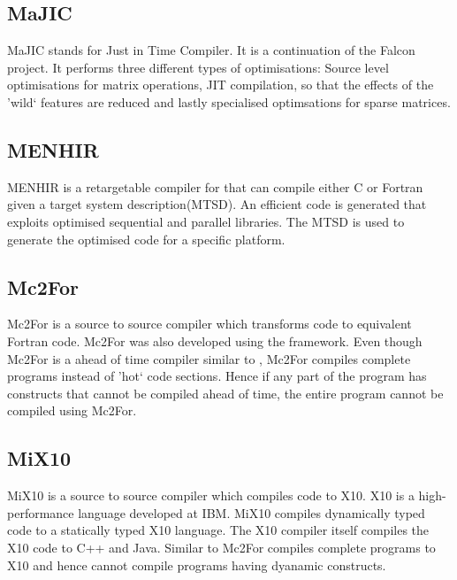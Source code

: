 \subsection{MaJIC}
MaJIC\cite{Almasi:2002:MCM:543552.512564} stands for \matlab Just in Time Compiler. It is a continuation of the Falcon project. It performs three different types of optimisations: Source level optimisations for matrix operations, JIT compilation, so that the effects of the 'wild` \matlab features are reduced and lastly specialised optimsations for sparse matrices. 
\subsection{MENHIR}
MENHIR\cite{Chauveau:1999} is a retargetable compiler for \matlab that can compile either C or Fortran given a target system description(MTSD). An efficient code is generated that exploits optimised sequential and parallel libraries. The MTSD is used to generate the optimised code for a specific platform. 
\subsection{Mc2For}
Mc2For\cite{Li:2014} is a source to source compiler which transforms \matlab code to equivalent Fortran code. Mc2For was also developed using the \mclab framework. Even though Mc2For is a ahead of time compiler similar to \velocty, Mc2For compiles complete \matlab programs instead of 'hot` code sections. Hence if any part of the \matlab program has constructs that cannot be compiled ahead of time, the entire program cannot be compiled using Mc2For. 
\subsection{MiX10}
MiX10\cite{vkumar14} is a source to source compiler which compiles \matlab code to X10\cite{x10}. X10 is a high-performance language developed at IBM. MiX10 compiles dynamically typed \matlab code to a statically typed X10 language. The X10 compiler itself compiles the X10 code to C++ and Java. Similar to Mc2For compiles complete \matlab programs to X10 and hence cannot compile \matlab programs having dyanamic constructs.

